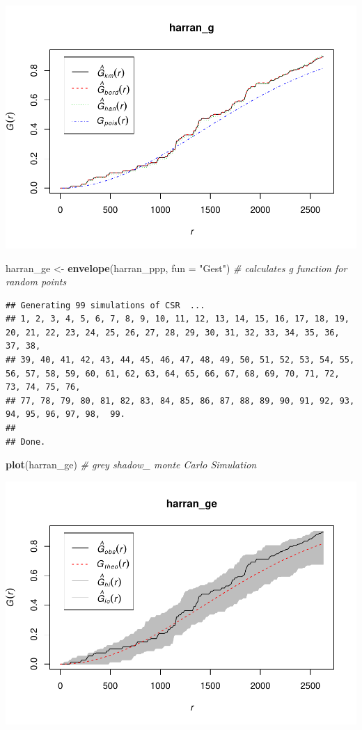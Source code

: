 \documentclass[]{article}
\newenvironment{Shaded}{\begin{snugshade}}{\end{snugshade}}
\newcommand{\KeywordTok}[1]{\textcolor[rgb]{0.13,0.29,0.53}{\textbf{{#1}}}}
\newcommand{\DataTypeTok}[1]{\textcolor[rgb]{0.13,0.29,0.53}{{#1}}}
\newcommand{\StringTok}[1]{\textcolor[rgb]{0.31,0.60,0.02}{{#1}}}
\newcommand{\CommentTok}[1]{\textcolor[rgb]{0.56,0.35,0.01}{\textit{{#1}}}}
\newcommand{\NormalTok}[1]{{#1}}
\begin{document}
\includegraphics{HarranPlain_files/figure-latex/unnamed-chunk-9-1.pdf}

\begin{Shaded}
\begin{Highlighting}[]
\NormalTok{harran_ge <-}\StringTok{ }\KeywordTok{envelope}\NormalTok{(harran_ppp, }\DataTypeTok{fun =} \StringTok{"Gest"}\NormalTok{) }\CommentTok{# calculates g function for random points}
\end{Highlighting}
\end{Shaded}

\begin{verbatim}
## Generating 99 simulations of CSR  ...
## 1, 2, 3, 4, 5, 6, 7, 8, 9, 10, 11, 12, 13, 14, 15, 16, 17, 18, 19, 20, 21, 22, 23, 24, 25, 26, 27, 28, 29, 30, 31, 32, 33, 34, 35, 36, 37, 38,
## 39, 40, 41, 42, 43, 44, 45, 46, 47, 48, 49, 50, 51, 52, 53, 54, 55, 56, 57, 58, 59, 60, 61, 62, 63, 64, 65, 66, 67, 68, 69, 70, 71, 72, 73, 74, 75, 76,
## 77, 78, 79, 80, 81, 82, 83, 84, 85, 86, 87, 88, 89, 90, 91, 92, 93, 94, 95, 96, 97, 98,  99.
## 
## Done.
\end{verbatim}

\begin{Shaded}
\begin{Highlighting}[]
\KeywordTok{plot}\NormalTok{(harran_ge) }\CommentTok{# grey shadow_ monte Carlo Simulation}
\end{Highlighting}
\end{Shaded}

\includegraphics{HarranPlain_files/figure-latex/unnamed-chunk-9-2.pdf}
\end{document}
